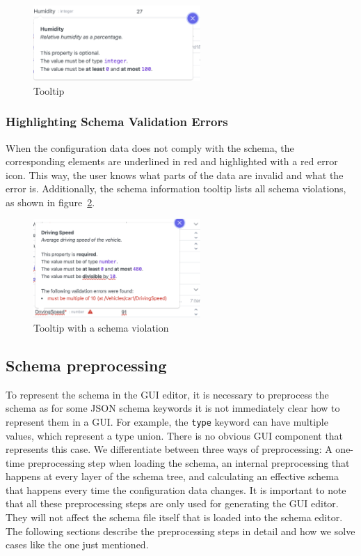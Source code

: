 \begin{figure}[hbt]
    \centering
    \includegraphics[width=2.5in]{figures/Tooltip_example}
    \caption{Tooltip}
    \label{fig:tooltip_example}
\end{figure}

\subsubsection{Highlighting Schema Validation Errors}
When the configuration data does not comply with the schema, the corresponding elements are underlined in red and highlighted with a red error icon.
This way, the user knows what parts of the data are invalid and what the error is.
Additionally, the schema information tooltip lists all schema violations, as shown in figure~\ref{fig:schema_violation}.

\begin{figure}[hbt]
    \centering
    \includegraphics[width=2.5in]{figures/schema_violation}
    \caption{Tooltip with a schema violation}
    \label{fig:schema_violation}
\end{figure}

\subsection{Schema preprocessing}\label{subsec:schema-preprocessing}

To represent the schema in the GUI editor, it is necessary to preprocess the schema as for some JSON schema keywords
it is not immediately clear how to represent them in a GUI\@.
For example, the \texttt{type} keyword can have multiple values, which represent a type union.
There is no obvious GUI component that represents this case.
We differentiate between three ways of preprocessing:
A one-time preprocessing step when loading the schema, an internal preprocessing that happens at every layer of the schema tree,
and calculating an effective schema that happens every time the configuration data changes.
It is important to note that all these preprocessing steps are only used for generating the GUI editor.
They will not affect the schema file itself that is loaded into the schema editor.
The following sections describe the preprocessing steps in detail and how we solve cases like the one just mentioned.

